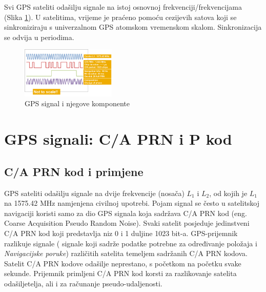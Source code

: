 \documentclass[a4paper,twoside,12pt]{memoir} %
\begin{document}
	Svi GPS sateliti odašilju signale na istoj osnovnoj frekvenciji/frekvencijama (Slika \ref{Fig:GPSSignal}). 
	U satelitima, vrijeme je praćeno pomoću cezijevih satova koji se sinkroniziraju s univerzalnom GPS atomskom vremenskom skalom. Sinkronizacija se odvija u periodima.
	\begin{figure}[H]
		\centering
		\includegraphics[width=0.4\textwidth]{GPS_Signals}
		\caption{GPS signal i njegove komponente \cite{GPS:1}}
		\label{Fig:GPSSignal}
	\end{figure}
	
	\section[C/A PRN kod]{GPS signali: C/A PRN i P kod}
	\subsection{C/A PRN kod i primjene}\label{CAkod}
	GPS sateliti odašilju signale na dvije frekvencije (nosača) $L_1$ i $L_2$, od kojih je $L_1$ na 1575.42 MHz namjenjena civilnoj upotrebi. Pojam signal se često u satelitskoj navigaciji
	koristi samo za dio GPS signala koja sadržava C/A PRN kod (eng. Coarse Acquisition Pseudo Random Noise). 
	Svaki satelit posjeduje jedinstveni C/A PRN kod koji predstavlja niz 0 i 1 duljine 1023 bit-a.
	GPS-prijemnik razlikuje signale ( signale koji sadrže podatke potrebne za određivanje položaja i \textit{Navigacijske poruke}) različitih satelita
	temeljem sadržanih C/A PRN kodova. Satelit C/A PRN kodove odašilje neprestano, s početkom na početku svake sekunde. Prijemnik primljeni C/A PRN kod korsti za 
	razlikovanje satelita odašiljetelja, ali i za računanje pseudo-udaljenosti.
	
\end{document}
